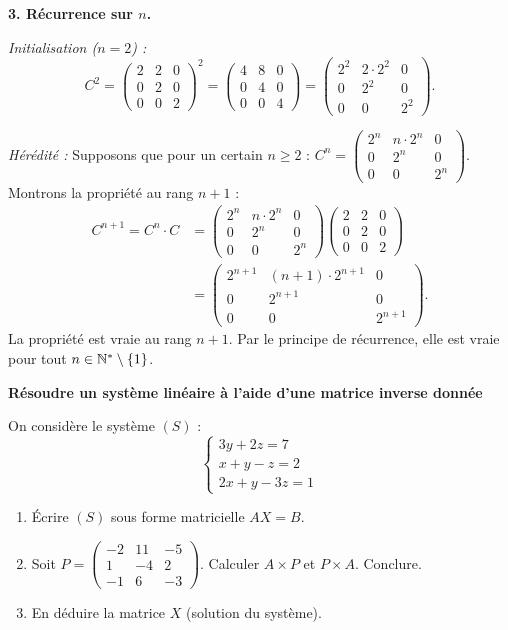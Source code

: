 \textbf{3. Récurrence sur $n$.}

\textit{Initialisation ($n=2$) :}
\[
C^2 = \begin{pmatrix}2&2&0\\0&2&0\\0&0&2\end{pmatrix}^2
= \begin{pmatrix}4&8&0\\0&4&0\\0&0&4\end{pmatrix}
= \begin{pmatrix}2^2&2\cdot2^2&0\\0&2^2&0\\0&0&2^2\end{pmatrix}.
\]

\textit{Hérédité :} Supposons que pour un certain $n\geq 2$ :
$C^n = \begin{pmatrix}2^n&n\cdot2^n&0\\0&2^n&0\\0&0&2^n\end{pmatrix}$.
Montrons la propriété au rang $n+1$ :
\[
\begin{aligned}
	C^{n+1} = C^n \cdot C
	&= \begin{pmatrix}2^n&n\cdot2^n&0\\0&2^n&0\\0&0&2^n\end{pmatrix}
	\begin{pmatrix}2&2&0\\0&2&0\\0&0&2\end{pmatrix} \\
	&= \begin{pmatrix}2^{n+1}&(n+1)\cdot2^{n+1}&0\\0&2^{n+1}&0\\0&0&2^{n+1}\end{pmatrix}.
\end{aligned}
\]
La propriété est vraie au rang $n+1$. Par le principe de récurrence,
elle est vraie pour tout $n\in\mathbb{N}^*\setminus\{1\}$.

\exerciceresolu
\textbf{Résoudre un système linéaire à l'aide d'une matrice inverse donnée}

On considère le système $(S)$ :
\[
\begin{cases}
	3y + 2z = 7 \\
	x + y - z = 2 \\
	2x + y - 3z = 1
\end{cases}
\]
\begin{enumerate}
	\item Écrire $(S)$ sous forme matricielle $AX = B$.
	\item Soit $P = \begin{pmatrix}-2&11&-5\\1&-4&2\\-1&6&-3\end{pmatrix}$.
	Calculer $A\times P$ et $P\times A$. Conclure.
	\item En déduire la matrice $X$ (solution du système).
\end{enumerate}

